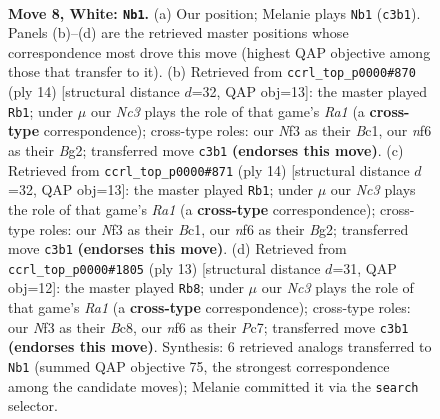 \documentclass[11pt]{article}
\begin{document}
\begin{figure}[p]\centering
\begin{subfigure}{0.46\textwidth}\centering
\resizebox{\linewidth}{!}{%
\newchessgame
\chessboard[
  setfen={1rbq1rk1/pp1pppbp/2n2np1/2p5/2P4P/2N2NP1/PP1PPPB1/R1BQ1RK1 w - - 1 8},
  showmover=false,
  pgfstyle=straightmove, color=movearrow, markmove={c3-b1}
]}
\caption{}
\end{subfigure}\hfill
\begin{subfigure}{0.46\textwidth}\centering
\resizebox{\linewidth}{!}{%
\newchessgame
\chessboard[
  setfen={r1bq1rk1/pp2ppbp/2np1np1/2p5/2P5/P1N2NP1/1P1PPPBP/R1BQ1RK1 w - - 1 8},
  showmover=false,
  pgfstyle=straightmove, color=movearrow, markmove={a1-b1}
]}
\caption{}
\end{subfigure}
\\[4pt]
\begin{subfigure}{0.46\textwidth}\centering
\resizebox{\linewidth}{!}{%
\newchessgame
\chessboard[
  setfen={r1bq1rk1/pp2ppbp/2np1np1/2p5/2P5/P1N2NP1/1P1PPPBP/R1BQ1RK1 w - - 1 8},
  showmover=false,
  pgfstyle=straightmove, color=movearrow, markmove={a1-b1}
]}
\caption{}
\end{subfigure}\hfill
\begin{subfigure}{0.46\textwidth}\centering
\resizebox{\linewidth}{!}{%
\newchessgame
\chessboard[
  setfen={r1bq1rk1/1pppppbp/p1n2np1/8/2PP4/2N2NP1/PP2PPBP/R1BQ1RK1 b - - 0 7},
  showmover=false,
  pgfstyle=straightmove, color=movearrow, markmove={a8-b8}
]}
\caption{}
\end{subfigure}
\caption{\textbf{Move 8, White: \texttt{Nb1}.} (a) Our position; Melanie plays \texttt{Nb1} (\texttt{c3b1}). Panels (b)--(d) are the retrieved master positions whose correspondence most drove this move (highest QAP objective among those that transfer to it). (b) Retrieved from \texttt{ccrl\_top\_p0000\#870} (ply 14) [structural distance $d$=32, QAP obj=13]: the master played \texttt{Rb1}; under $\mu$ our \emph{Nc3} plays the role of that game's \emph{Ra1} (a \textbf{cross-type} correspondence); cross-type roles: our \emph{N}f3 as their \emph{B}c1, our \emph{n}f6 as their \emph{B}g2; transferred move \texttt{c3b1} \textbf{(endorses this move)}. (c) Retrieved from \texttt{ccrl\_top\_p0000\#871} (ply 14) [structural distance $d$=32, QAP obj=13]: the master played \texttt{Rb1}; under $\mu$ our \emph{Nc3} plays the role of that game's \emph{Ra1} (a \textbf{cross-type} correspondence); cross-type roles: our \emph{N}f3 as their \emph{B}c1, our \emph{n}f6 as their \emph{B}g2; transferred move \texttt{c3b1} \textbf{(endorses this move)}. (d) Retrieved from \texttt{ccrl\_top\_p0000\#1805} (ply 13) [structural distance $d$=31, QAP obj=12]: the master played \texttt{Rb8}; under $\mu$ our \emph{Nc3} plays the role of that game's \emph{Ra1} (a \textbf{cross-type} correspondence); cross-type roles: our \emph{N}f3 as their \emph{B}c8, our \emph{n}f6 as their \emph{P}c7; transferred move \texttt{c3b1} \textbf{(endorses this move)}. Synthesis: 6 retrieved analogs transferred to \texttt{Nb1} (summed QAP objective 75, the strongest correspondence among the candidate moves); Melanie committed it via the \texttt{search} selector.}
\label{fig:thought-m14}
\end{figure}
\end{document}
